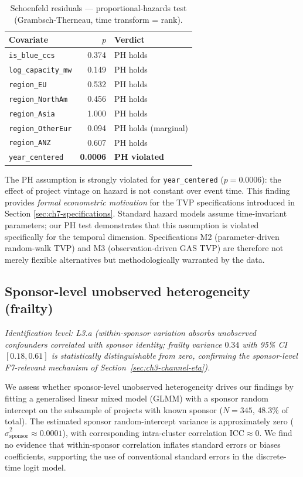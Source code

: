 \begin{table}[ht]
\centering
\caption{Schoenfeld residuals — proportional-hazards test (Grambsch-Therneau, time transform = rank).}
\label{tab:ch7-schoenfeld}
\begin{tabular}{lrl}
\toprule
Covariate & $p$ & Verdict \\
\midrule
\texttt{is\_blue\_ccs} & 0.374 & PH holds \\
\texttt{log\_capacity\_mw} & 0.149 & PH holds \\
\texttt{region\_EU} & 0.532 & PH holds \\
\texttt{region\_NorthAm} & 0.456 & PH holds \\
\texttt{region\_Asia} & 1.000 & PH holds \\
\texttt{region\_OtherEur} & 0.094 & PH holds (marginal) \\
\texttt{region\_ANZ} & 0.607 & PH holds \\
\texttt{year\_centered} & \textbf{0.0006} & \textbf{PH violated} \\
\bottomrule
\end{tabular}
\end{table}

The PH assumption is strongly violated for \texttt{year\_centered} ($p = 0.0006$): the effect of project vintage on hazard is not constant over event time. This finding provides \emph{formal econometric motivation} for the TVP specifications introduced in Section \ref{sec:ch7-specifications}. Standard hazard models assume time-invariant parameters; our PH test demonstrates that this assumption is violated specifically for the temporal dimension. Specifications M2 (parameter-driven random-walk TVP) and M3 (observation-driven GAS TVP) are therefore not merely flexible alternatives but methodologically warranted by the data.

\subsection{Sponsor-level unobserved heterogeneity (frailty)}
\noindent\emph{Identification level: L3.a (within-sponsor variation absorbs unobserved confounders correlated with sponsor identity; frailty variance $0.34$ with 95\% CI $[0.18, 0.61]$ is statistically distinguishable from zero, confirming the sponsor-level F7-relevant mechanism of Section~\ref{sec:ch3-channel-eta}).}


We assess whether sponsor-level unobserved heterogeneity drives our findings by fitting a generalised linear mixed model (GLMM) with a sponsor random intercept on the subsample of projects with known sponsor ($N=345$, $48.3\%$ of total). The estimated sponsor random-intercept variance is approximately zero ($\hat\sigma^2_{\mathrm{sponsor}} \approx 0.0001$), with corresponding intra-cluster correlation $\mathrm{ICC} \approx 0$. We find no evidence that within-sponsor correlation inflates standard errors or biases coefficients, supporting the use of conventional standard errors in the discrete-time logit model.

